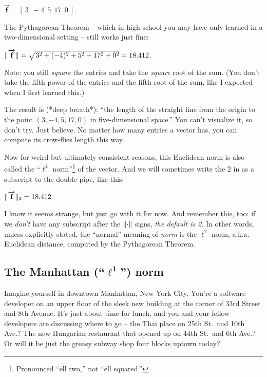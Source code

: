 \begin{center}
$\overrightarrow{\textbf{f}} = [\ 3\ \ -4\ \ 5\ \ 17\ \ 0\ ]$.
\end{center}

The Pythagorean Theorem -- which in high school you may have only learned in a
two-dimensional setting -- still works just fine:

\begin{center}
$\lVert\overrightarrow{\textbf{f}}\rVert =
\sqrt{3^2 + (-4)^2 + 5^2 + 17^2 + 0^2} = 18.412$.
\end{center}

Note: you still \textit{square} the entries and take the \textit{square} root
of the sum. (You don't take the fifth power of the entries and the fifth root
of the sum, like I expected when I first learned this.)

The result is (*deep breath*): ``the length of the straight line from the
origin to the point $(3,-4,5,17,0)$ in five-dimensional space.'' You can't
visualize it, so don't try. Just believe. No matter how many entries a vector
has, you can compute its crow-flies length this way.

Now for weird but ultimately consistent reasons, this Euclidean norm is also
called the ``$\ell^2$ norm''\footnote{Pronounced ``ell two,'' not ``ell
squared.''} of the vector. And we will sometimes write the 2 in as a subscript
to the double-pipe, like this:

\begin{center}
$\lVert\overrightarrow{\textbf{f}}\rVert_2 = 18.412$.
\end{center}

I know it seems strange, but just go with it for now. And remember this, too:
if we \textit{don't} have any subscript after the $\lVert\cdot\rVert$ signs,
\textit{the default is 2}. In other words, unless explicitly stated, the
``normal'' meaning of \textit{norm} is the $\ell^2$ norm, a.k.a. Euclidean
distance, computed by the Pythagorean Theorem.

\subsection{The Manhattan (``$\boldsymbol\ell^\textbf{1}$'') norm}



Imagine yourself in downtown Manhattan, New York City. You're a software
developer on an upper floor of the sleek new building at the corner of 33rd
Street and 8th Avenue. It's just about time for lunch, and you and your fellow
developers are discussing where to go -- the Thai place on 25th St.~and 10th
Ave.? The new Hungarian restaurant that opened up on 44th St.~and 6th Ave.? Or
will it be just the greasy subway shop four blocks uptown today?

